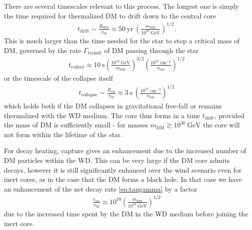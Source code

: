 \documentclass[twocolumn, preprintnumbers,amsmath,amssymb,prd, superscriptaddress]{revtex4}
\newcommand{\GeV}{\text{GeV}}
\newcommand{\cm}{\text{cm}}
\def\r{\right)}
\def\l{\left(}
\begin{document}
There are several timescales relevant to this process.
The longest one is simply the time required for thermalized DM to drift down to the central core
\begin{align}
\label{eq:tdrift}
  t_\text{drift} \sim \frac{R_\text{WD}}{v_\text{th}}
  \approx 50 ~\text{yr} ~ \l \frac{m_\text{DM}}{10^{16} ~\GeV} \r^{1/2}.
\end{align}
This is much larger than the time needed for the star to stop a critical mass of DM, governed by the rate $\Gamma_\text{transit}$ of DM passing through the star
\begin{align}
\label{eq:tcol}
  t_\text{collect}
  \approx 10 ~\text{s} \l \frac{10^{16} ~\GeV}{m_\text{DM}} \r^{3/2}
  \l \frac{10^{31} ~\cm^{-3}}{n_\text{ion}}\r^{1/2}
\end{align}
or the timescale of the collapse itself
\begin{align}
  t_\text{collapse} \sim \frac{R_\text{vir}}{v_\text{th}}
  \approx 3 ~\text{s} ~ \l \frac{10^{31} ~\cm^{-3}}{n_\text{ion}}\r^{1/2}
\end{align}
which holds both if the DM collapses in gravitational free-fall or remains thermalized with the WD medium.
The core thus forms in a time $t_\text{drift}$, provided the mass of DM is sufficiently small - for masses $m_\text{DM} \gtrsim 10^{30}~\GeV$ the core will not form within the lifetime of the star.

For decay heating, capture gives an enhancement due to the increased number of DM particles within the WD.
This can be very large if the DM core admits decays, however it is still significantly enhanced over the wind scenario even for inert cores, as in the case that the DM forms a black hole.
In that case we have an enhancement of the net decay rate \eqref{eq:taugamma} by a factor
\begin{align}
  \frac{v_\text{esc}}{v_\text{th}}
  \approx 10^{10} \l \frac{m_\text{DM}}{10^{16}~\GeV} \r^{1/2}
\end{align}
due to the increased time spent by the DM in the WD medium before joining the inert core.
\end{document}
